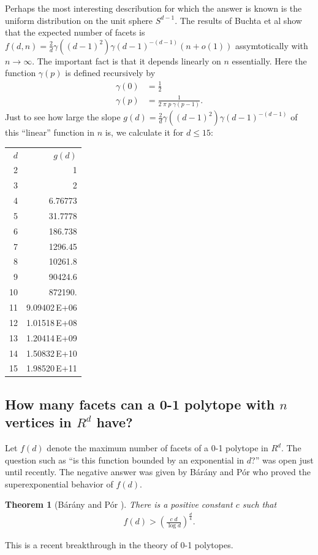 \documentclass[a4paper,12pt]{article}
\newtheorem{theorem}{Theorem}
\begin{document}
Perhaps the most interesting describution for which the answer
is known is the uniform distribution on the unit sphere $S^{d-1}$.
The results of Buchta et al \cite{bmt-sacb-85} show that the expected number
of facets is $f(d, n) = \frac{2}{d} \gamma((d-1)^2) \gamma(d-1)^{-(d-1)} (n + o(1))$
assymtotically with $n \rightarrow \infty$.
The important fact is that it depends linearly on $n$ essentially.
Here the function $\gamma(p)$ is defined recursively by
\begin{align*}
 \gamma(0) &=\frac{1}{2}\\
 \gamma(p) &=\frac{1}{2 \; \pi \;  p \; \gamma(p-1)}.
\end{align*}
\noindent
Just to see how large the slope $g(d)=\frac{2}{d} \gamma((d-1)^2) 
\gamma(d-1)^{-(d-1)}$ of this ``linear'' function in $n$ is, 
we calculate it for $d \le 15$:
\begin{center}
\begin{tabular}{rr}
$d$ & $g(d)$\\
2 & 1 \\ 3 & 2 \\ 4 & 6.76773 \\ 5 & 31.7778 \\ 6 & 
   186.738 \\ 7 & 1296.45 \\ 8 & 10261.8 \\ 9 & 90424.6 \\ 10 & 
   872190. \\ 11 & 9.09402\,E+06 \\ 12 & 1.01518\,E+08 \\ 13 & 
1.20414\,E+09 \\ 14 & 1.50832\,E+10 \\ 15 & 1.98520\,E+11
\end{tabular}
\end{center}

\subsection{How many facets can a 0-1 polytope with $n$ vertices in
$R^d$ have?}
\label{polytope:01Hcomplexity}

Let $f(d)$ denote the maximum number of facets of a
0-1 polytope in $R^d$.
The question such as ``is this function bounded by an exponential in $d$?''
was open just until recently.  The negative answer was given by
B\'ar\'any and P\'or who proved the superexponential behavior
of $f(d)$.
\begin{theorem}[B\'ar\'any and P\'or \cite{bp-01pmf-00}]
There is a positive constant $c$ such that
\begin{align}
f(d) >  \left ( \frac{c\;d}{\log d} \right )^{\frac{d}{4}}.
\end{align}
\end{theorem} 
This is a recent breakthrough in the theory of 0-1 polytopes.
\end{document}
